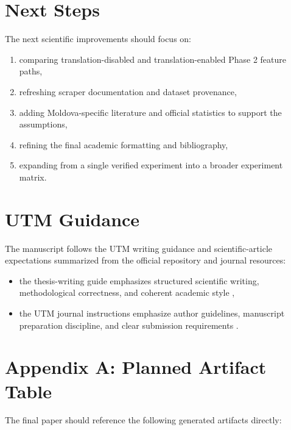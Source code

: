 \documentclass[11pt,a4paper]{article}
\begin{document}
\section{Next Steps}
The next scientific improvements should focus on:

\begin{enumerate}
  \item comparing translation-disabled and translation-enabled Phase 2 feature paths,
  \item refreshing scraper documentation and dataset provenance,
  \item adding Moldova-specific literature and official statistics to support the assumptions,
  \item refining the final academic formatting and bibliography,
  \item expanding from a single verified experiment into a broader experiment matrix.
\end{enumerate}

\section*{UTM Guidance}
The manuscript follows the UTM writing guidance and scientific-article expectations summarized from the official repository and journal resources:

\begin{itemize}
  \item the thesis-writing guide emphasizes structured scientific writing, methodological correctness, and coherent academic style \cite{utm_thesis_guide},
  \item the UTM journal instructions emphasize author guidelines, manuscript preparation discipline, and clear submission requirements \cite{utm_jes_instructions}.
\end{itemize}

\section*{Appendix A: Planned Artifact Table}
The final paper should reference the following generated artifacts directly:
\end{document}
